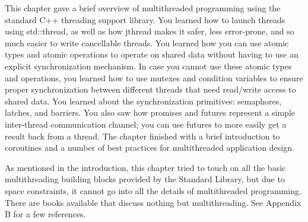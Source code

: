 This chapter gave a brief overview of multithreaded programming using the standard C++ threading support library. You learned how to launch threads using std::thread, as well as how jthread makes it safer, less error-prone, and so much easier to write cancellable threads. You learned how you can use atomic types and atomic operations to operate on shared data without having to use an explicit synchronization mechanism. In case you cannot use these atomic types and operations, you learned how to use mutexes and condition variables to ensure proper synchronization between different threads that need read/write access to shared data. You learned about the synchronization primitives: semaphores, latches, and barriers. You also saw how promises and futures represent a simple inter-thread communication channel; you can use futures to more easily get a result back from a thread. The chapter finished with a brief introduction to coroutines and a number of best practices for multithreaded application design.

As mentioned in the introduction, this chapter tried to touch on all the basic multithreading building blocks provided by the Standard Library, but due to space constraints, it cannot go into all the details of multithreaded programming. There are books available that discuss nothing but multithreading. See Appendix B for a few references.

